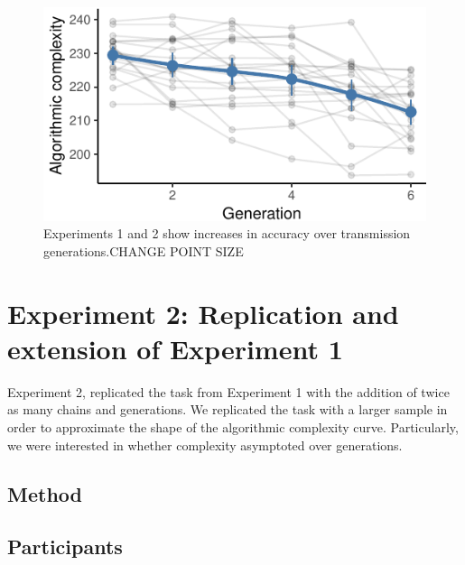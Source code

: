 \documentclass[10pt, letterpaper]{article}
\newenvironment{CodeChunk}{}{}
\begin{document}
\begin{CodeChunk}
\begin{figure}[tb]

{\centering \includegraphics{figs/e1_bdm_plot-1} 

}

\caption[Experiments 1 and 2 show increases in accuracy over transmission generations.CHANGE POINT SIZE]{Experiments 1 and 2 show increases in accuracy over transmission generations.CHANGE POINT SIZE}\label{fig:e1_bdm_plot}
\end{figure}
\end{CodeChunk}

\hypertarget{experiment-2-replication-and-extension-of-experiment-1}{%
\section{Experiment 2: Replication and extension of Experiment
1}\label{experiment-2-replication-and-extension-of-experiment-1}}

Experiment 2, replicated the task from Experiment 1 with the addition of
twice as many chains and generations. We replicated the task with a
larger sample in order to approximate the shape of the algorithmic
complexity curve. Particularly, we were interested in whether complexity
asymptoted over generations.

\hypertarget{method-1}{%
\subsection{Method}\label{method-1}}

\hypertarget{participants-1}{%
\subsection{Participants}\label{participants-1}}
\end{document}
